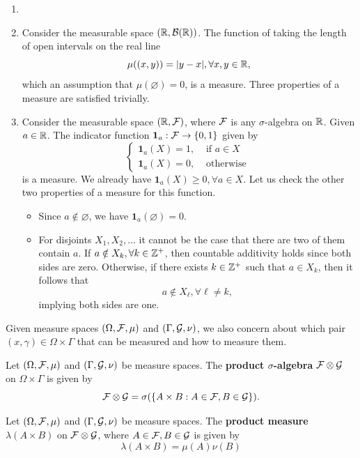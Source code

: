 \begin{example}
  \begin{enumerate}
    \item []
    \item Consider the measurable space $(\mathbb{R}, \mathcal{B}(\mathbb{R}))  $. The function of taking the length of open intervals on the real line
          $$\mu((x,y))=|y-x|,\forall x,y\in\mathbb{R},$$
          which an assumption that $\mu(\varnothing)=0$, is a measure. Three properties of a measure are satisfied trivially.
    \item Consider the measurable space $(\mathbb{R}, \mathcal{F})$, where $\mathcal{F}$ is any $\sigma$-algebra on $\mathbb{R}$. Given $a\in\mathbb{R}$. The indicator function $\mathbf{1}_a: \mathcal{F}\to\{0,1\}$ given by
          $$\begin{cases}
              \mathbf{1}_a(X)=1, & \text{ if } a\in X \\
              \mathbf{1}_a(X)=0, & \text{ otherwise }
            \end{cases}$$
          is a measure. We already have $\mathbf{1}_a(X)\ge0, \forall a\in X$. Let us check the other two properties of a measure for this function.
          \begin{itemize}
            \item Since $a\notin\varnothing$, we have $\mathbf{1}_a(\varnothing)=0$.
            \item For disjoints $X_1,X_2,\ldots$ it cannot be the case that there are two of them contain $a$. If $a\notin X_k,\forall k\in\mathbb{Z}^+$, then countable additivity holds since both sides are zero. Otherwise, if there exists $k\in \mathbb{Z}^+$ such that $a\in X_k$, then it follows that $$a\notin X_\ell, \forall \ell\ne k,$$ implying both sides are one.
          \end{itemize}
  \end{enumerate}
\end{example}

Given measure spaces $(\Omega,\mathcal{F},\mu)$ and $(\Gamma,\mathcal{G},\nu)$, we also concern about which pair $(x,\gamma)\in\Omega\times\Gamma$ that can be measured and how to measure them.

\begin{definition}
  Let $(\Omega,\mathcal{F},\mu)$ and $(\Gamma,\mathcal{G},\nu)$ be measure spaces. The \textbf{product $\sigma$-algebra} $\mathcal{F}\otimes\mathcal{G}$ on $\Omega\times\Gamma$ is given by
  $$\mathcal{F}\otimes\mathcal{G}=\sigma(\{A\times B : A\in\mathcal{F},B\in\mathcal{G}\}).$$
\end{definition}

\begin{definition}
  Let $(\Omega,\mathcal{F},\mu)$ and $(\Gamma,\mathcal{G},\nu)$ be measure spaces. The \textbf{product measure} $\lambda(A\times B)$ on $\mathcal{F}\otimes\mathcal{G}$, where $A\in\mathcal{F},B\in\mathcal{G}$ is given by
  $$\lambda(A\times B)=\mu(A)\nu(B)$$
\end{definition}

